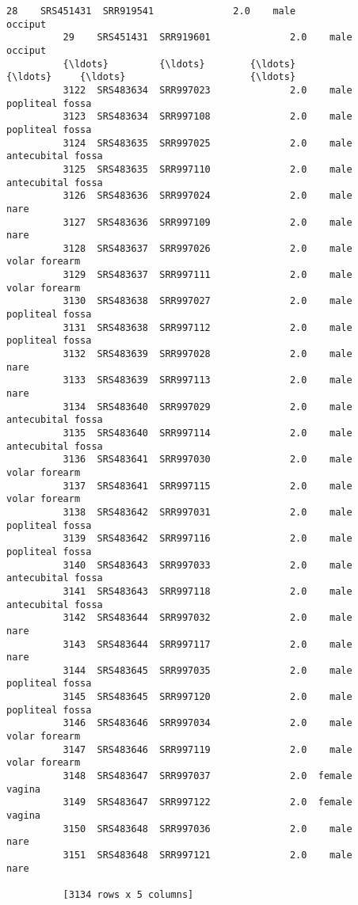 \documentclass[11pt]{article}
\begin{document}
\begin{Verbatim}[commandchars=\\\{\}]
          28    SRS451431  SRR919541              2.0    male                  occiput
          29    SRS451431  SRR919601              2.0    male                  occiput
          {\ldots}         {\ldots}        {\ldots}              {\ldots}     {\ldots}                      {\ldots}
          3122  SRS483634  SRR997023              2.0    male          popliteal fossa
          3123  SRS483634  SRR997108              2.0    male          popliteal fossa
          3124  SRS483635  SRR997025              2.0    male        antecubital fossa
          3125  SRS483635  SRR997110              2.0    male        antecubital fossa
          3126  SRS483636  SRR997024              2.0    male                     nare
          3127  SRS483636  SRR997109              2.0    male                     nare
          3128  SRS483637  SRR997026              2.0    male            volar forearm
          3129  SRS483637  SRR997111              2.0    male            volar forearm
          3130  SRS483638  SRR997027              2.0    male          popliteal fossa
          3131  SRS483638  SRR997112              2.0    male          popliteal fossa
          3132  SRS483639  SRR997028              2.0    male                     nare
          3133  SRS483639  SRR997113              2.0    male                     nare
          3134  SRS483640  SRR997029              2.0    male        antecubital fossa
          3135  SRS483640  SRR997114              2.0    male        antecubital fossa
          3136  SRS483641  SRR997030              2.0    male            volar forearm
          3137  SRS483641  SRR997115              2.0    male            volar forearm
          3138  SRS483642  SRR997031              2.0    male          popliteal fossa
          3139  SRS483642  SRR997116              2.0    male          popliteal fossa
          3140  SRS483643  SRR997033              2.0    male        antecubital fossa
          3141  SRS483643  SRR997118              2.0    male        antecubital fossa
          3142  SRS483644  SRR997032              2.0    male                     nare
          3143  SRS483644  SRR997117              2.0    male                     nare
          3144  SRS483645  SRR997035              2.0    male          popliteal fossa
          3145  SRS483645  SRR997120              2.0    male          popliteal fossa
          3146  SRS483646  SRR997034              2.0    male            volar forearm
          3147  SRS483646  SRR997119              2.0    male            volar forearm
          3148  SRS483647  SRR997037              2.0  female                   vagina
          3149  SRS483647  SRR997122              2.0  female                   vagina
          3150  SRS483648  SRR997036              2.0    male                     nare
          3151  SRS483648  SRR997121              2.0    male                     nare
          
          [3134 rows x 5 columns]
\end{Verbatim}
            
\end{document}
